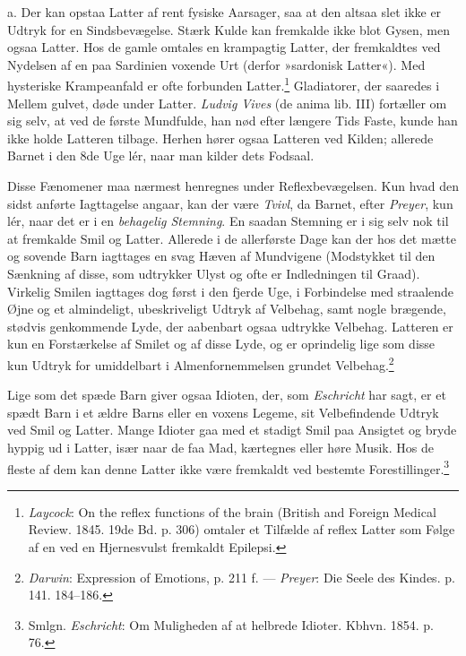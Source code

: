 \documentclass[12pt,a4paper,openany]{book}
\newcommand{\opage}[1]{\marginnote{\footnotesize\textit{[#1]}}}
\begin{document}
a. Der kan opstaa Latter af rent fysiske Aarsager, saa at den altsaa
slet ikke er Udtryk for en Sindsbevægelse. Stærk Kulde kan fremkalde
ikke blot Gysen, men ogsaa Latter. Hos de gamle omtales en krampagtig
Latter, der fremkaldtes ved Nydelsen af en paa Sardinien voxende Urt
(derfor »sardonisk Latter«). Med hysteriske Krampeanfald er ofte
forbunden Latter.\footnote[3]{\emph{Laycock}: On the reflex functions of
the brain (British and Foreign Medical Review. 1845. 19de Bd. p. 306)
omtaler et Tilfælde af reflex Latter som Følge af en ved en Hjernesvulst fremkaldt Epilepsi.} Gladiatorer, der saaredes i Mellem%
\opage{344}gulvet, døde under Latter. \emph{Ludvig Vives} (de anima lib.
III) fortæller om sig selv, at ved de første Mundfulde, han nød efter
længere Tids Faste, kunde han ikke holde Latteren tilbage. Herhen hører
ogsaa Latteren ved Kilden; allerede Barnet i den 8de Uge lér, naar man
kilder dets Fodsaal.

Disse Fænomener maa nærmest henregnes under Reflexbevægelsen. Kun hvad
den sidst anførte Iagttagelse angaar, kan der være \emph{Tvivl}, da
Barnet, efter \emph{Preyer}, kun lér, naar det er i en \emph{behagelig
Stemning}. En saadan Stemning er i sig selv nok til at fremkalde Smil og
Latter. Allerede i de allerførste Dage kan der hos det mætte og sovende
Barn iagttages en svag Hæven af Mundvigene (Modstykket til den Sænkning
af disse, som udtrykker Ulyst og ofte er Indledningen til Graad).
Virkelig Smilen iagttages dog først i den fjerde Uge, i Forbindelse med
straalende Øjne og et almindeligt, ubeskriveligt Udtryk af Velbehag,
samt nogle brægende, stødvis genkommende Lyde, der aabenbart ogsaa
udtrykke Velbehag. Latteren er kun en Forstærkelse af Smilet og af disse
Lyde, og er oprindelig lige som disse kun Udtryk for umiddelbart i
Almenfornemmelsen grundet Velbehag.\footnote[1]{\emph{Darwin}:
Expression of Emotions, p. 211 f. --- \emph{Preyer}: Die Seele des
Kindes. p. 141. 184--186.}

Lige som det spæde Barn giver ogsaa Idioten, der, som \emph{Eschricht}
har sagt, er et spædt Barn i et ældre Barns eller en voxens Legeme, sit
Velbefindende Udtryk ved Smil og Latter. Mange Idioter gaa med et
stadigt Smil paa Ansigtet og bryde hyppig ud i Latter, især naar de faa
Mad, kærtegnes eller høre Musik. Hos de fleste af dem kan denne Latter
ikke være fremkaldt ved bestemte Forestillinger.\footnote[2]{Smlgn.
\emph{Eschricht}: Om Muligheden af at helbrede Idioter. Kbhvn. 1854. p.
76.}
\end{document}
